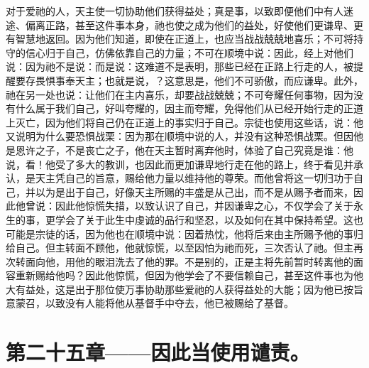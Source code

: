 对于爱祂的人，天主使一切协助他们获得益处；真是事，以致即便他们中有人迷途、偏离正路，甚至这件事本身，祂也使之成为他们的益处，好使他们更谦卑、更有智慧地返回。因为他们知道，即使在正道上，也应当战战兢兢地喜乐；不可将持守的信心归于自己，仿佛依靠自己的力量；不可在顺境中说：因此，经上对他们说：因为祂不是说：而是说：这难道不是表明，那些已经在正路上行走的人，被提醒要存畏惧事奉天主；也就是说，？这意思是，他们不可骄傲，而应谦卑。此外，祂在另一处也说：让他们在主内喜乐，却要战战兢兢；不可夸耀任何事物，因为没有什么属于我们自己，好叫夸耀的，因主而夸耀，免得他们从已经开始行走的正道上灭亡，因为他们将自己仍在正道上的事实归于自己。宗徒也使用这些话，说：他又说明为什么要恐惧战栗：因为那在顺境中说的人，并没有这种恐惧战栗。但因他是恩许之子，不是丧亡之子，他在天主暂时离弃他时，体验了自己究竟是谁：他说，看！他受了多大的教训，也因此而更加谦卑地行走在他的路上，终于看见并承认，是天主凭自己的旨意，赐给他力量以维持他的尊荣。而他曾将这一切归功于自己，并以为是出于自己，好像天主所赐的丰盛是从己出，而不是从赐予者而来，因此他曾说：因此他惊慌失措，以致认识了自己，并因谦卑之心，不仅学会了关于永生的事，更学会了关于此生中虔诚的品行和坚忍，以及如何在其中保持希望。这也可能是宗徒的话，因为他也在顺境中说：因着热忱，他将后来由主所赐予他的事归给自己。但主转面不顾他，他就惊慌，以至因怕为祂而死，三次否认了祂。但主再次转面向他，用他的眼泪洗去了他的罪。不是别的，正是主将先前暂时转离他的面容重新赐给他吗？因此他惊慌，但因为他学会了不要信赖自己，甚至这件事也为他大有益处，这是出于那位使万事协助那些爱祂的人获得益处的大能；因为他已按旨意蒙召，以致没有人能将他从基督手中夺去，他已被赐给了基督。\par


\section{第二十五章——因此当使用谴责。}

